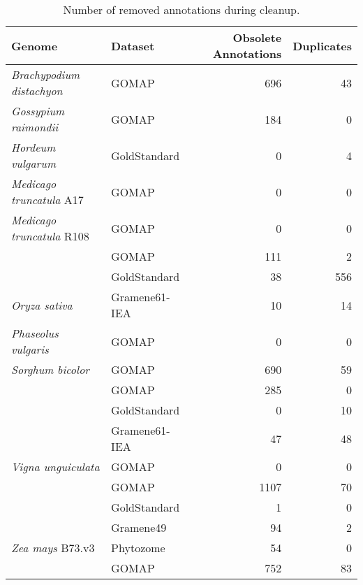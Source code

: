 \documentclass[utf8]{frontiersSCNS}
\begin{document}
\begin{table}[t]

\caption{\label{tab:cleanup-table}Number of removed annotations during cleanup.}
\centering
\begin{threeparttable}
\begin{tabular}{llrr}
\toprule
Genome & Dataset & Obsolete Annotations & Duplicates\\
\midrule
\rowcolor{gray!6}  \textit{Brachypodium distachyon} & GOMAP & 696 & 43\\
\cmidrule{1-4}
\textit{Gossypium raimondii} & GOMAP & 184 & 0\\
\cmidrule{1-4}
\rowcolor{gray!6}  \textit{Hordeum vulgarum} & GoldStandard & 0 & 4\\
\cmidrule{1-4}
\textit{Medicago truncatula} A17 & GOMAP & 0 & 0\\
\cmidrule{1-4}
\rowcolor{gray!6}  \textit{Medicago truncatula} R108 & GOMAP & 0 & 0\\
\cmidrule{1-4}
 & GOMAP & 111 & 2\\

\rowcolor{gray!6}   & GoldStandard & 38 & 556\\

\multirow{-3}{*}{\raggedright\arraybackslash \textit{Oryza sativa}} & Gramene61-IEA & 10 & 14\\
\cmidrule{1-4}
\rowcolor{gray!6}  \textit{Phaseolus vulgaris} & GOMAP & 0 & 0\\
\cmidrule{1-4}
\textit{Sorghum bicolor} & GOMAP & 690 & 59\\
\cmidrule{1-4}
\rowcolor{gray!6}   & GOMAP & 285 & 0\\

 & GoldStandard & 0 & 10\\

\rowcolor{gray!6}  \multirow{-3}{*}{\raggedright\arraybackslash \textit{Triticum aestivum}} & Gramene61-IEA & 47 & 48\\
\cmidrule{1-4}
\textit{Vigna unguiculata} & GOMAP & 0 & 0\\
\cmidrule{1-4}
\rowcolor{gray!6}   & GOMAP & 1107 & 70\\

 & GoldStandard & 1 & 0\\

\rowcolor{gray!6}   & Gramene49 & 94 & 2\\

\multirow{-4}{*}{\raggedright\arraybackslash \textit{Zea mays} B73.v3} & Phytozome & 54 & 0\\
\cmidrule{1-4}
\rowcolor{gray!6}   & GOMAP & 752 & 83\\


\end{tabular}
\end{threeparttable}
\end{table}
\end{document}

